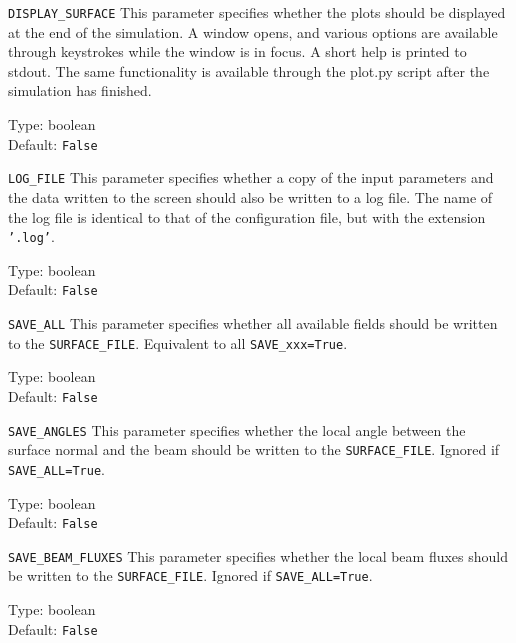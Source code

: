 \begin{keydescription}{\texttt{DISPLAY\_SURFACE}}
This parameter specifies whether the plots should be displayed at the end of the
simulation. A window opens, and various options are available through keystrokes
while the window is in focus. A short help is printed to
stdout. The same functionality is available through the plot.py script after
the simulation has finished.
\begin{keytab}
   Type:    \> boolean \\
   Default: \> \texttt{False}
\end{keytab}
\end{keydescription}

\begin{keydescription}{\texttt{LOG\_FILE}}
This parameter specifies whether a copy of the input parameters and the data
written to the screen should also be written to a log file. The name of the log
file is identical to that of the configuration file, but with the extension
\texttt{'.log'}.
\begin{keytab}
   Type:    \> boolean \\
   Default: \> \texttt{False}
\end{keytab}
\end{keydescription}

\begin{keydescription}{\texttt{SAVE\_ALL}}
This parameter specifies whether all available fields should be
written to the \texttt{SURFACE\_FILE}. Equivalent to all \texttt{SAVE\_xxx=True}.
\begin{keytab}
   Type:    \> boolean \\
   Default: \> \texttt{False}
\end{keytab}
\end{keydescription}

\begin{keydescription}{\texttt{SAVE\_ANGLES}}
This parameter specifies whether the local angle between the surface
normal and the beam should be written to the \texttt{SURFACE\_FILE}. Ignored if 
\texttt{SAVE\_ALL=True}.
\begin{keytab}
   Type:    \> boolean \\
   Default: \> \texttt{False}
\end{keytab}
\end{keydescription}

\begin{keydescription}{\texttt{SAVE\_BEAM\_FLUXES}}
This parameter specifies whether the local beam fluxes should be written
to the \texttt{SURFACE\_FILE}. Ignored if \texttt{SAVE\_ALL=True}.
\begin{keytab}
   Type:    \> boolean \\
   Default: \> \texttt{False}
\end{keytab}
\end{keydescription}

